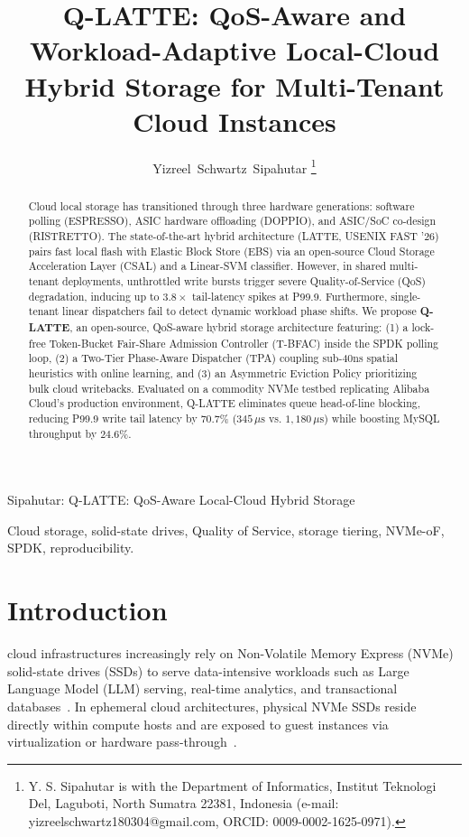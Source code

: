 \documentclass[lettersize,journal]{IEEEtran}
\begin{document}
\title{Q-LATTE: QoS-Aware and Workload-Adaptive Local-Cloud Hybrid Storage for Multi-Tenant Cloud Instances}

\author{Yizreel~Schwartz~Sipahutar%
\thanks{Y. S. Sipahutar is with the Department of Informatics, Institut Teknologi Del, Laguboti, North Sumatra 22381, Indonesia (e-mail: yizreelschwartz180304@gmail.com, ORCID: 0009-0002-1625-0971).}%
}

%
{Sipahutar: Q-LATTE: QoS-Aware Local-Cloud Hybrid Storage}

\maketitle

\begin{abstract}
Cloud local storage has transitioned through three hardware generations: software polling (ESPRESSO), ASIC hardware offloading (DOPPIO), and ASIC/SoC co-design (RISTRETTO). The state-of-the-art hybrid architecture (LATTE, USENIX FAST '26) pairs fast local flash with Elastic Block Store (EBS) via an open-source Cloud Storage Acceleration Layer (CSAL) and a Linear-SVM classifier. However, in shared multi-tenant deployments, unthrottled write bursts trigger severe Quality-of-Service (QoS) degradation, inducing up to $3.8\times$ tail-latency spikes at P99.9. Furthermore, single-tenant linear dispatchers fail to detect dynamic workload phase shifts. We propose \textbf{Q-LATTE}, an open-source, QoS-aware hybrid storage architecture featuring: (1) a lock-free Token-Bucket Fair-Share Admission Controller (T-BFAC) inside the SPDK polling loop, (2) a Two-Tier Phase-Aware Dispatcher (TPA) coupling sub-40ns spatial heuristics with online learning, and (3) an Asymmetric Eviction Policy prioritizing bulk cloud writebacks. Evaluated on a commodity NVMe testbed replicating Alibaba Cloud's production environment, Q-LATTE eliminates queue head-of-line blocking, reducing P99.9 write tail latency by $70.7\%$ ($345\,\mu\text{s}$ vs. $1,180\,\mu\text{s}$) while boosting MySQL throughput by $24.6\%$.
\end{abstract}

\begin{IEEEkeywords}
Cloud storage, solid-state drives, Quality of Service, storage tiering, NVMe-oF, SPDK, reproducibility.
\end{IEEEkeywords}

\section{Introduction}
 cloud infrastructures increasingly rely on Non-Volatile Memory Express (NVMe) solid-state drives (SSDs) to serve data-intensive workloads such as Large Language Model (LLM) serving, real-time analytics, and transactional databases~\cite{yang2026here, zhang2024ebs}. In ephemeral cloud architectures, physical NVMe SSDs reside directly within compute hosts and are exposed to guest instances via virtualization or hardware pass-through~\cite{bjorling2021zns, spdk2025}.
\end{document}
